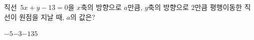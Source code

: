 직선~$5x+y-13=0$을 $x$축의 방향으로 $a$만큼, $y$축의 방향으로 $2$만큼 평행이동한 직선이 원점을 지날 때, $a$의 값은?
\begin{choices32}{$-5$}{$-3$}{$-1$}{$3$}{$5$}\end{choices32}
